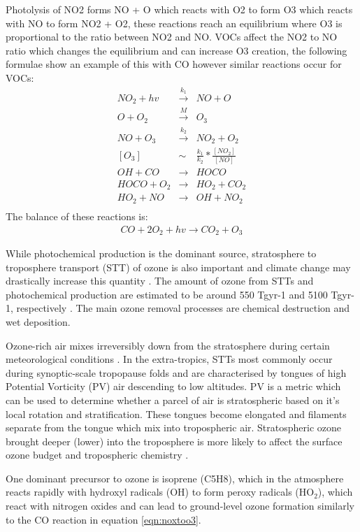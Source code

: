 Photolysis of NO2 forms NO + O which reacts with O2 to form O3 which reacts with NO to form NO2 + O2, these reactions reach an equilibrium where O3 is proportional to the ratio between NO2 and NO.
VOCs affect the NO2 to NO ratio which changes the equilibrium and can increase O3 creation, the following formulae show an example of this with CO however similar reactions occur for VOCs:
\begin{eqnarray*}
\label{eqn:noxtoo3}
NO_2 + hv &\overset{k_1}{\rightarrow}& NO + O \\
O + O_2 &\overset{M}{\rightarrow}& O_3 \\
NO + O_3 &\overset{k_2}{\rightarrow}& NO_2 + O_2 \\
[O_3] &\sim& \frac{k_1}{k_2} * \frac{[NO_2]}{[NO]} \\
OH + CO &{\rightarrow}& HOCO \\
HOCO + O_2 &{\rightarrow}& HO_2 + CO_2 \\
HO_2 + NO &{\rightarrow}& OH + NO_2 \\
\end{eqnarray*}
The balance of these reactions is:
\begin{eqnarray*} CO + 2O_2 + hv {\rightarrow} CO_2 + O_3 \end{eqnarray*}

While photochemical production is the dominant source, stratosphere to troposphere transport (STT) of ozone is also important and climate change may drastically increase this quantity \cite{Hegglin_2009}.
The amount of ozone from STTs and photochemical production are estimated to be around 550 Tgyr-1 and 5100 Tgyr-1, respectively \cite{Stevenson_2006}. 
The main ozone removal processes are chemical destruction and wet deposition.

Ozone-rich air mixes irreversibly down from the stratosphere during certain meteorological conditions \citep{Sprenger2003,Mihalikova2012}.
In the extra-tropics, STTs most commonly occur during synoptic-scale tropopause folds \citep{Sprenger2003} and are characterised by tongues of high Potential Vorticity (PV) air descending to low altitudes.
PV is a metric which can be used to determine whether a parcel of air is stratospheric based on it's local rotation and stratification.
These tongues become elongated and filaments separate from the tongue which mix into tropospheric air.
Stratospheric ozone brought deeper (lower) into the troposphere is more likely to affect the surface ozone budget and tropospheric chemistry \citep{Zanis2003,Langford_2009}.

One dominant precursor to ozone is isoprene (C5H8), which in the atmosphere reacts rapidly with hydroxyl radicals (OH) to form peroxy radicals (HO$_2$), which react with nitrogen oxides and can lead to ground-level ozone formation similarly to the CO reaction in equation \ref{eqn:noxtoo3}.

  